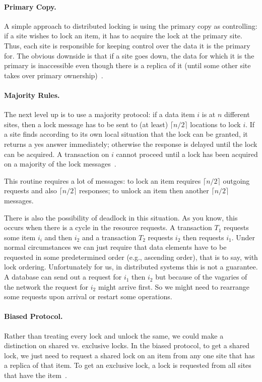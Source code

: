 \paragraph{Primary Copy.}A simple approach to distributed locking is using the primary copy as controlling: if a site wishes to lock an item, it has to acquire the lock at the primary site. Thus, each site is responsible for keeping control over the data it is the primary for. The obvious downside is that if a site goes down, the data for which it is the primary is inaccessible even though there is a replica of it (until some other site takes over primary ownership)~\cite{dsc}.

\paragraph{Majority Rules.} The next level up is to use a majority protocol: if a data item $i$ is at $n$ different sites, then a lock message has to be sent to (at least) $\lceil n/2 \rceil$ locations to lock $i$. If a site finds according to its own local situation that the lock can be granted, it returns a yes answer immediately; otherwise the response is delayed until the lock can be acquired. A transaction on $i$ cannot proceed until a lock has been acquired on a majority of the lock messages~\cite{dsc}.

This routine requires a lot of messages: to lock an item requires $\lceil n/2 \rceil$ outgoing requests and also  $\lceil n/2 \rceil$ responses; to unlock an item then another $\lceil n/2 \rceil$ messages.

There is also the possibility of deadlock in this situation. As you know, this occurs when there is a cycle in the resource requests. A transaction $T_{1}$ requests some item $i_{i}$ and then $i_{2}$ and a transaction $T_{2}$ requests $i_{2}$ then requests $i_{1}$. Under normal circumstances we can just require that data elements have to be requested in some predetermined order (e.g., ascending order), that is to say, with lock ordering. Unfortunately for us, in distributed systems this is not a guarantee. A database can send out a request for $i_{1}$ then $i_{2}$ but because of the vagaries of the network the request for $i_{2}$ might arrive first. So we might need to rearrange some requests upon arrival or restart some operations.

\paragraph{Biased Protocol.} Rather than treating every lock and unlock the same, we could make a distinction on shared vs. exclusive locks. In the biased protocol, to get a shared lock, we just need to request a shared lock on an item from any one site that has a replica of that item. To get an exclusive lock, a lock is requested from all sites that have the item~\cite{dsc}.

